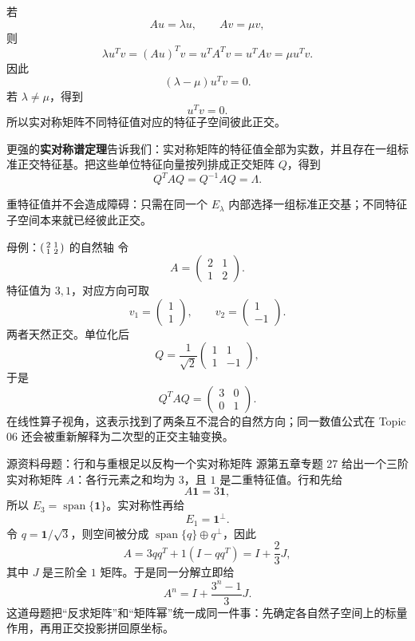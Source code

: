 \documentclass[11pt,a4paper]{ctexart}
\newcommand{\kw}[1]{\textbf{\color{deep}#1}}
\begin{document}
若
\[
Au=\lambda u,
\qquad
Av=\mu v,
\]
则
\[
\lambda u^Tv
=(Au)^Tv
=u^TA^Tv
=u^TAv
=\mu u^Tv.
\]
因此
\[
(\lambda-\mu)u^Tv=0.
\]
若 $\lambda\neq\mu$，得到
\[
\boxed{u^Tv=0.}
\]
所以实对称矩阵不同特征值对应的特征子空间彼此正交。

更强的\kw{实对称谱定理}告诉我们：实对称矩阵的特征值全部为实数，并且存在一组标准正交特征基。把这些单位特征向量按列排成正交矩阵 $Q$，得到
\[
\boxed{Q^TAQ=Q^{-1}AQ=\Lambda.}
\]

重特征值并不会造成障碍：只需在同一个 $E_\lambda$ 内部选择一组标准正交基；不同特征子空间本来就已经彼此正交。

\begin{examplebox}{母例：$\begin{psmallmatrix}2&1\\1&2\end{psmallmatrix}$ 的自然轴}
令
\[
A=\begin{pmatrix}2&1\\1&2\end{pmatrix}.
\]
特征值为 $3,1$，对应方向可取
\[
v_1=\begin{pmatrix}1\\1\end{pmatrix},
\qquad
v_2=\begin{pmatrix}1\\-1\end{pmatrix}.
\]
两者天然正交。单位化后
\[
Q=\frac1{\sqrt2}
\begin{pmatrix}1&1\\1&-1\end{pmatrix},
\]
于是
\[
Q^TAQ=\begin{pmatrix}3&0\\0&1\end{pmatrix}.
\]
在线性算子视角，这表示找到了两条互不混合的自然方向；同一数值公式在 Topic 06 还会被重新解释为二次型的正交主轴变换。
\end{examplebox}

\begin{examplebox}{源资料母题：行和与重根足以反构一个实对称矩阵}
源第五章专题 27 给出一个三阶实对称矩阵 $A$：各行元素之和均为 $3$，且 $1$ 是二重特征值。行和先给
\[
A\mathbf1=3\mathbf1,
\]
所以 $E_3=\operatorname{span}\{\mathbf1\}$。实对称性再给
\[
E_1=\mathbf1^\perp.
\]
令 $q=\mathbf1/\sqrt3$，则空间被分成 $\operatorname{span}\{q\}\oplus q^\perp$，因此
\[
A=3qq^T+1(I-qq^T)
=\boxed{I+\frac23J},
\]
其中 $J$ 是三阶全 $1$ 矩阵。于是同一分解立即给
\[
\boxed{A^n=I+\frac{3^n-1}{3}J}.
\]
这道母题把“反求矩阵”和“矩阵幂”统一成同一件事：先确定各自然子空间上的标量作用，再用正交投影拼回原坐标。
\end{examplebox}
\end{document}
